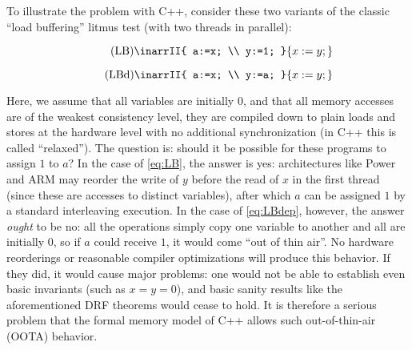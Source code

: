 To illustrate the problem with C++, consider these two variants of the
classic ``load buffering'' litmus test (with two threads in parallel):
\begin{center}
\begin{minipage}{.46\columnwidth}
\begin{equation}\label{eq:LB}\tag{LB}
\inarrII{ a:=x; \\ y:=1; }{ x:=y; }\!\!\!
\end{equation}
\end{minipage}
\hfill
\begin{minipage}{.46\columnwidth}
\begin{equation}\label{eq:LBdep}\tag{LBd}
\inarrII{ a:=x; \\ y:=a; }{ x:=y; }
\end{equation}
\end{minipage}
\end{center}
Here, we assume that all variables are initially $0$, and that all
memory accesses are of the weakest consistency level, \ie they are
compiled down to plain loads and stores at the hardware level with no
additional synchronization (in C++ this is called ``relaxed'').  The
question is: should it be possible for these programs to assign $1$ to
$a$?  In the case of \ref{eq:LB}, the answer is yes: architectures
like Power and ARM may reorder the write of $y$ before the read of $x$
in the first thread (since these are accesses to distinct variables),
after which $a$ can be assigned $1$ by a standard interleaving
execution. In the case of \ref{eq:LBdep}, however, the answer
\emph{ought} to be no: all the operations simply copy one variable to
another and all are initially $0$, so if $a$ could receive $1$, it
would come ``out of thin air''.  No hardware reorderings or reasonable
compiler optimizations will produce this behavior.  If they did, it
would cause major problems: one would not be able to establish even
basic invariants (such as $x = y = 0$), and basic sanity results like
the aforementioned DRF theorems would cease to hold.  It is therefore
a serious problem that the formal memory model of C++ allows such
out-of-thin-air (OOTA) behavior.

